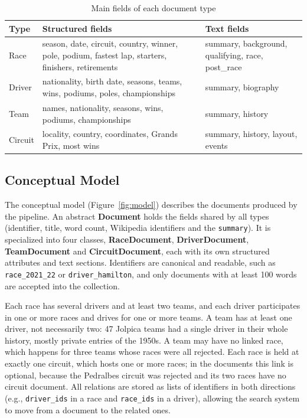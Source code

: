 \documentclass[sigconf]{acmart}
\begin{document}
\begin{table}[ht]
  \small
  \begin{tabular}{p{1.1cm}p{4.0cm}p{2.3cm}}
    \toprule
    Type & Structured fields & Text fields \\
    \midrule
    Race & season, date, circuit, country, winner, pole, podium, fastest
    lap, starters, finishers, retirements & summary, background,
    qualifying, race, post\_race \\
    Driver & nationality, birth date, seasons, teams, wins, podiums, poles,
    championships & summary, biography \\
    Team & names, nationality, seasons, wins, podiums, championships &
    summary, history \\
    Circuit & locality, country, coordinates, Grands Prix, most wins &
    summary, history, layout, events \\
    \bottomrule
  \end{tabular}
  \caption{Main fields of each document type}
  \label{tab:fields}
\end{table}

\subsection{Conceptual Model}
\label{sec:model}
The conceptual model (Figure~\ref{fig:model}) describes the documents
produced by the pipeline. An abstract \textbf{Document} holds the fields
shared by all types (identifier, title, word count, Wikipedia
identifiers and the \texttt{summary}). It is specialized into four classes,
\textbf{RaceDocument}, \textbf{DriverDocument}, \textbf{TeamDocument} and
\textbf{CircuitDocument}, each with its own structured attributes and text
sections. Identifiers are canonical and readable, such as
\texttt{race\_2021\_22} or \texttt{driver\_hamilton}, and only documents with at least 100 words are accepted into the collection.

Each race has several drivers and at least two teams, and each driver
participates in one or more races and drives for one or more teams. A team has
at least one driver, not necessarily two: 47 Jolpica teams had a single driver
in their whole history, mostly private entries of the 1950s. A team may have no
linked race, which happens for three teams whose races were all rejected.
Each race is held at exactly one circuit, which hosts one or more races; in the
documents this link is optional, because the Pedralbes circuit was rejected
and its two races have no circuit document. All relations are stored as lists
of identifiers in both directions (e.g., \texttt{driver\_ids} in a race and
\texttt{race\_ids} in a driver), allowing the search system to move from a
document to the related ones.
\end{document}
